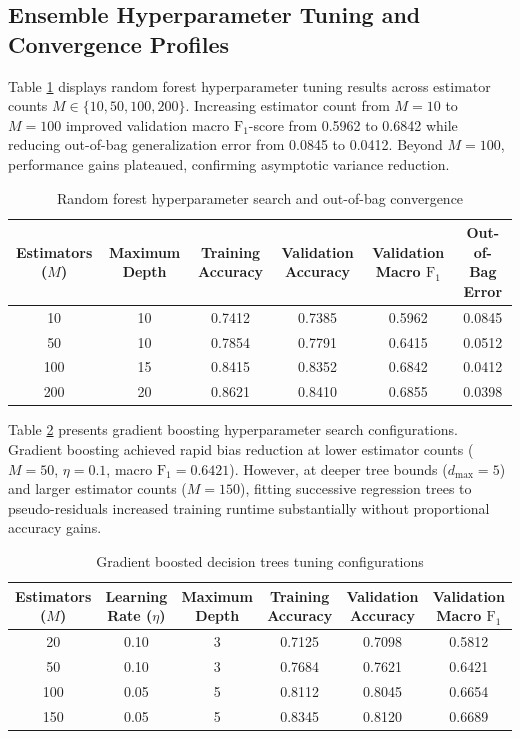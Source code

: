 \documentclass[10pt,conference,compsoc]{IEEEtran}
\begin{document}
\subsection{Ensemble Hyperparameter Tuning and Convergence Profiles}
Table \ref{tab:rf_hyperparams} displays random forest hyperparameter tuning results across estimator counts $M \in \{10, 50, 100, 200\}$. Increasing estimator count from $M=10$ to $M=100$ improved validation macro $\text{F}_1$-score from 0.5962 to 0.6842 while reducing out-of-bag generalization error from 0.0845 to 0.0412. Beyond $M=100$, performance gains plateaued, confirming asymptotic variance reduction.

\begin{table}[t]
\caption{Random forest hyperparameter search and out-of-bag convergence}
\label{tab:rf_hyperparams}
\centering
\begin{tabular}{cccccc}
\toprule
\textbf{Estimators ($M$)} & \textbf{Maximum Depth} & \textbf{Training Accuracy} & \textbf{Validation Accuracy} & \textbf{Validation Macro $\text{F}_1$} & \textbf{Out-of-Bag Error} \\
\midrule
10 & 10 & 0.7412 & 0.7385 & 0.5962 & 0.0845 \\
50 & 10 & 0.7854 & 0.7791 & 0.6415 & 0.0512 \\
100 & 15 & 0.8415 & 0.8352 & 0.6842 & 0.0412 \\
200 & 20 & 0.8621 & 0.8410 & 0.6855 & 0.0398 \\
\bottomrule
\end{tabular}
\end{table}

Table \ref{tab:gbdt_hyperparams} presents gradient boosting hyperparameter search configurations. Gradient boosting achieved rapid bias reduction at lower estimator counts ($M=50$, $\eta=0.1$, macro $\text{F}_1 = 0.6421$). However, at deeper tree bounds ($d_{\text{max}}=5$) and larger estimator counts ($M=150$), fitting successive regression trees to pseudo-residuals increased training runtime substantially without proportional accuracy gains.

\begin{table}[t]
\caption{Gradient boosted decision trees tuning configurations}
\label{tab:gbdt_hyperparams}
\centering
\begin{tabular}{cccccc}
\toprule
\textbf{Estimators ($M$)} & \textbf{Learning Rate ($\eta$)} & \textbf{Maximum Depth} & \textbf{Training Accuracy} & \textbf{Validation Accuracy} & \textbf{Validation Macro $\text{F}_1$} \\
\midrule
20 & 0.10 & 3 & 0.7125 & 0.7098 & 0.5812 \\
50 & 0.10 & 3 & 0.7684 & 0.7621 & 0.6421 \\
100 & 0.05 & 5 & 0.8112 & 0.8045 & 0.6654 \\
150 & 0.05 & 5 & 0.8345 & 0.8120 & 0.6689 \\
\bottomrule
\end{tabular}
\end{table}
\end{document}
